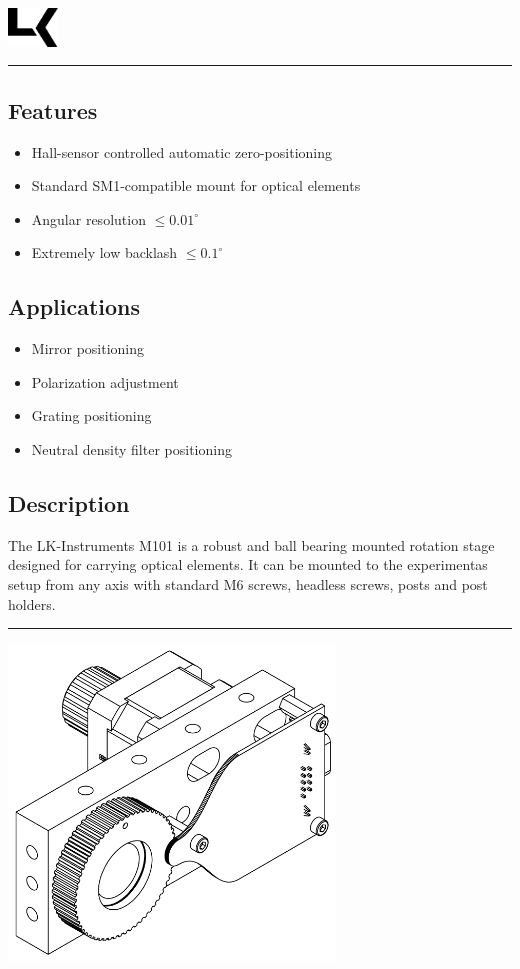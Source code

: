 \documentclass[a4paper, final, 12pt, oneside]{scrartcl}
\numberwithin{equation}{section}
\numberwithin{table}{section}
\numberwithin{figure}{section}
\begin{document}
\thispagestyle{empty}
\includegraphics[width=0.1\textwidth]{../general/logo_black.pdf}
\hfill {\Huge \textbf{\textsf{\productName}}} \hfill {\Huge \textbf{\textsf{\productNumber}}}\\
\noindent\rule{\textwidth}{0.4pt}

\begin{multicols}{2}
\subsection*{Features}
\begin{itemize}
  \item[] Hall-sensor controlled automatic zero-positioning
  \item[] Standard SM1-compatible mount for optical elements
  \item[] Angular resolution $\leq 0.01^{\circ}$
  \item[] Extremely low backlash $\leq 0.1^{\circ}$
\end{itemize}

\FloatBarrier
\subsection*{Applications}
\begin{itemize}
  \item[] Mirror positioning
  \item[] Polarization adjustment
  \item[] Grating positioning
  \item[] Neutral density filter positioning
\end{itemize}

\FloatBarrier
\subsection*{Description}
The LK-Instruments M101 is a robust and ball bearing mounted rotation
stage designed for carrying optical elements. It can be mounted to the
experimentas setup from any axis with standard M6 screws, headless screws,
posts and post holders. 
\end{multicols}
\noindent\rule{\textwidth}{0.4pt}
\vfill
\centerline{\includegraphics[width=0.65\textwidth]{./drawings/m101_full_dwg.pdf}}
\end{document}
